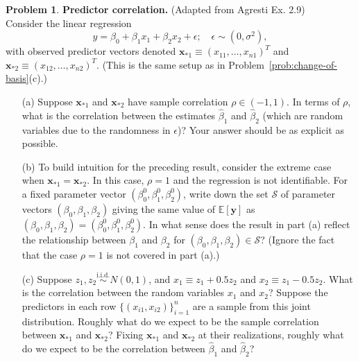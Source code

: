 \documentclass[11pt,letterpaper,english,oneside]{article} %
\theoremstyle{definition} %
\newtheorem{problem}{Problem}
\newenvironment{prob}{\clearpage \begin{problem}\hspace{0pt}}{\end{problem}}
\begin{document}
\begin{prob} \textbf{Predictor correlation.} (Adapted from Agresti Ex. 2.9) \\

\noindent Consider the linear regression
\begin{equation*}
y = \beta_0 + \beta_1 x_1 + \beta_2 x_2 + \epsilon; \quad \epsilon \sim (0, \sigma^2),
\end{equation*}
with observed predictor vectors denoted $\bm x_{*1} \equiv (x_{11}, \dots, x_{n1})^T$ and $\bm x_{*2} \equiv (x_{12}, \dots, x_{n2})^T$. (This is the same setup as in Problem~\ref{prob:change-of-basis}(c).) 
\begin{enumerate}
\item[(a)] Suppose $\bm x_{*1}$ and $\bm x_{*2}$  have sample correlation $\rho \in (-1,1)$. In terms of $\rho$, what is the correlation between the estimates $\widehat \beta_1$ and $\widehat \beta_2$ (which are random variables due to the randomness in $\epsilon$)? Your answer should be as explicit as possible.
\item[(b)] To build intuition for the preceding result, consider the extreme case when $\bm x_{*1} = \bm x_{*2}$. In this case, $\rho = 1$ and the regression is not identifiable. For a fixed parameter vector $(\beta_0^0, \beta_1^0, \beta_2^0)$, write down the set $\mathcal S$ of parameter vectors $(\beta_0, \beta_1, \beta_2)$ giving the same value of $\mathbb E[\bm y]$ as $(\beta_0, \beta_1, \beta_2) = (\beta_0^0, \beta_1^0, \beta_2^0)$. In what sense does the result in part (a) reflect the relationship between $\beta_1$ and $\beta_2$ for $(\beta_0, \beta_1, \beta_2) \in \mathcal S$? (Ignore the fact that the case $\rho = 1$ is not covered in part (a).)
\item[(c)] Suppose $z_1, z_2 \overset{\text{i.i.d.}} \sim N(0,1)$, and $x_1 \equiv z_1 + 0.5z_2$ and $x_2 \equiv z_1 - 0.5z_2$. What is the correlation between the random variables $x_1$ and $x_2$? Suppose the predictors in each row $\{(x_{i1}, x_{i2})\}_{i = 1}^n$ are a sample from this joint distribution. Roughly what do we expect to be the sample correlation between $\bm x_{*1}$ and $\bm x_{*2}$? Fixing $\bm x_{*1}$ and $\bm x_{*2}$ at their realizations, roughly what do we expect to be the correlation between $\widehat \beta_1$ and $\widehat \beta_2$?

\end{enumerate}
\end{prob}
\end{document}
